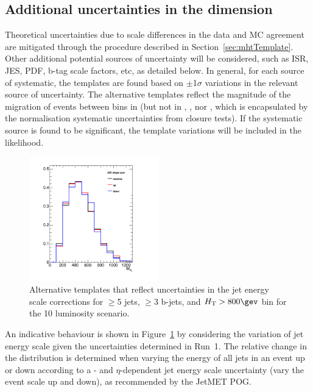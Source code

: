 \subsection{Additional uncertainties in the \mht dimension}
\label{sec:addMhtUnc}
Theoretical uncertainties due to scale differences in the data and MC agreement 
are mitigated through the procedure described in
Section~\ref{sec:mhtTemplate}. Other additional potential 
sources of uncertainty will be considered, such as
ISR, JES, PDF, b-tag scale factors, etc, as detailed below. In
general, for each source of systematic, the \mht templates are found
based on $\pm$1$\sigma$ variations in the relevant source of
uncertainty. The alternative templates reflect the magnitude of the
migration of events between bins in \mht (but not in \njet, \nb, nor
\scalht, which is encapsulated by the normalisation systematic
uncertainties from closure tests). If the systematic source is found
to be significant, the template variations will be included in the
likelihood. 

\begin{figure}[]
  \centering
  \includegraphics[width=0.5\textwidth]{figures/closureTests/mhtJetSyst_SMS_T1bbbb_2J_mGl1000_mLSP900_JEC_ge3b_ge5j_800_1600.png}
  \caption{\label{fig:jec-shape} Alternative \mht templates that
    reflect uncertainties in the jet energy scale corrections for
    $\geq$5 jets, $\geq$3 b-jets, and $\scalht > 800\gev$ bin for the
    10 \ifb luminosity scenario.}
\end{figure}

An indicative behaviour is shown in Figure~\ref{fig:jec-shape} by
considering the variation of jet energy scale given the uncertainties
determined in Run~1. The relative change in the \mht distribution is
determined when varying the energy of all jets in an event up or down
according to a \pt- and $\eta$-dependent jet energy scale uncertainty
(\ie vary the event scale up and down), as recommended by the JetMET
POG. 


